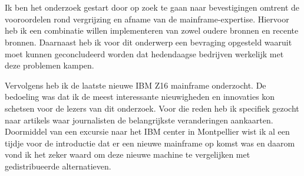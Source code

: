 
\chapter{}
\label{ch:methodologie}



\section{}
\label{sec:De literatuur- en vergelijkende studie}

Ik ben het onderzoek gestart door op zoek te gaan naar bevestigingen omtrent de vooroordelen rond vergrijzing en afname van de mainframe-expertise. Hiervoor heb ik een combinatie willen implementeren van zowel oudere bronnen en recente bronnen. Daarnaast heb ik voor dit onderwerp een bevraging opgesteld waaruit moet kunnen geconcludeerd worden dat hedendaagse bedrijven werkelijk met deze problemen kampen. 

Vervolgens heb ik de laatste nieuwe IBM Z16 mainframe onderzocht. De bedoeling was dat ik de meest interessante nieuwigheden en innovaties kon schetsen voor de lezers van dit onderzoek. Voor die reden heb ik specifiek gezocht naar artikels waar journalisten de belangrijkste veranderingen aankaarten. Doormiddel van een excursie naar het IBM center in Montpellier wist ik al een tijdje voor de introductie dat er een nieuwe mainframe op komst was en daarom vond ik het zeker waard om deze nieuwe machine te vergelijken met gedistribueerde alternatieven.


\section{}
\label{sec:De bevraging}


\section{}
\label{sec:De praktische uitwerking}
